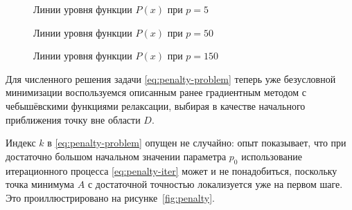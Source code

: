 \begin{figure}[!thb]
  \centering
  \caption{Линии уровня функции $P(x)$ при $p=5$}
    \label{fig:pen-contours2}
\end{figure}

\begin{figure}[!thb]
  \centering
  \caption{Линии уровня функции $P(x)$ при $p=50$}
  \label{fig:pen-contours3}
\end{figure}

\begin{figure}[!thb]
  \centering
  \caption{Линии уровня функции $P(x)$ при $p=150$}
  \label{fig:pen-contours4}
\end{figure}

Для численного решения задачи \eqref{eq:penalty-problem} теперь уже
безусловной минимизации воспользуемся описанным ранее градиентным
методом с чебышёвскими функциями релаксации, выбирая в качестве
начального приближения точку вне области $D$.

Индекс $k$ в \eqref{eq:penalty-problem} опущен не случайно: опыт
показывает, что при достаточно большом начальном значении параметра
$p_0$ использование итерационного процесса \eqref{eq:penalty-iter}
может и не понадобиться, поскольку точка минимума $A$ с достаточной
точностью локализуется уже на первом шаге. Это проиллюстрировано на
рисунке \ref{fig:penalty}.

